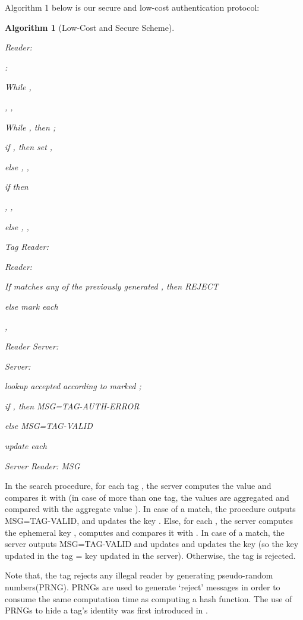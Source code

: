 \documentclass{easychair}
\newtheorem{algo}{Algorithm}
\begin{document}
Algorithm 1 below is our secure and low-cost authentication
protocol:
  \begin{algo}[Low-Cost and Secure Scheme]~\par
  Reader: 

  :
 
\indent  While ,

\indent  , , 

\indent  While , then ;

\indent  if  , then 
 set , 

\indent else , , 

\indent   

\indent   if  then

\indent  , , 

\indent  else , ,  

\indent   

 Tag  Reader:  
 
 Reader:
 
\indent   If  matches any of the previously generated , then REJECT

 \indent  else mark each  
 
\indent   ,  

  Reader  Server: 
 
  Server:
 
\indent    lookup accepted  according to marked ;

\indent if , then MSG=TAG-AUTH-ERROR

\indent  else MSG=TAG-VALID

\indent   update each 

  Server  Reader: MSG


\end{algo}

In the search procedure, for each tag , the server computes the value  and compares it with  (in case of more than one tag, the values are aggregated and compared with the aggregate value ). In case of a match, the procedure
outputs MSG=TAG-VALID, and updates the key . Else, for each , the server computes the ephemeral key , computes  and compares it with . In case of a match, the server outputs MSG=TAG-VALID and updates and updates the key  (so the key updated in the tag = key updated in the server). Otherwise, the tag is rejected.

Note that, the tag rejects any illegal reader by 
generating pseudo-random numbers(PRNG). PRNGs are used to generate `reject' messages in order to consume the same 
computation time as computing a hash function. The use of PRNGs to hide a tag's identity was first introduced in 
\cite{Weis}.
\end{document}
